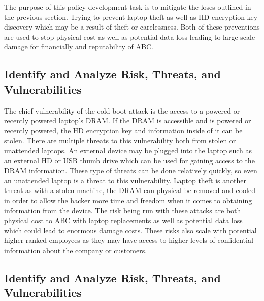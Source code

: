 \documentclass[paper=a4, fontsize=11pt]{scrartcl} %
\numberwithin{equation}{section} %
\numberwithin{figure}{section} %
\numberwithin{table}{section} %
\begin{document}
The purpose of this policy development task is to mitigate the loses outlined
in the previous section. Trying to prevent laptop theft as well as HD encryption
key discovery which may be a result of theft or carelessness. Both of these 
preventions are used to stop physical cost as well as potential data loss leading
to large scale damage for financially and reputability of ABC.


\subsection{Identify and Analyze Risk, Threats, and Vulnerabilities}

The chief vulnerability of the cold boot attack is the access to a powered
or recently powered laptop's DRAM. If the DRAM is accessible and is powered
or recently powered, the HD encryption key and information inside of it can
be stolen. There are multiple threats to this vulnerability both from stolen
or unattended laptops. An external device may be plugged into the laptop such
as an external HD or USB thumb drive which can be used for gaining access to
the DRAM information. These type of threats can be done relatively quickly, so
even an unattended laptop is a threat to this vulnerability. Laptop theft is
another threat as with a stolen machine, the DRAM can physical be removed and 
cooled in order to allow the hacker more time and freedom when it comes to
obtaining information from the device. The risk being run with these attacks
are both physical cost to ABC with laptop replacements as well as potential
data loss which could lead to enormous damage costs. These risks also scale 
with potential higher ranked employees as they may have access to higher levels
of confidential information about the company or customers. 


\subsection{Identify and Analyze Risk, Threats, and Vulnerabilities}
\end{document}
